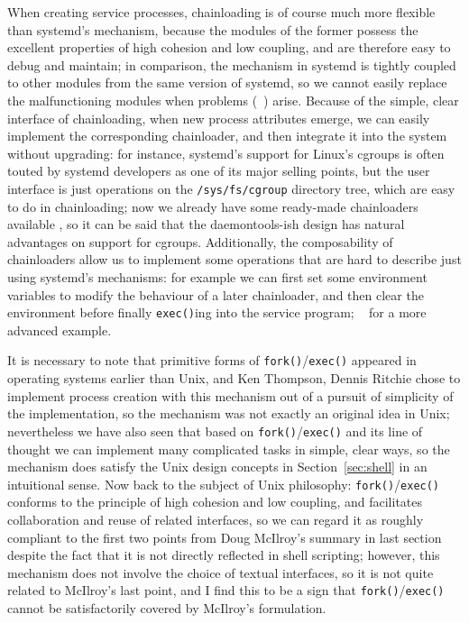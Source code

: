 When creating service processes, chainloading is of course much more flexible
than systemd's mechanism, because the modules of the former possess the
excellent properties of high cohesion and low coupling, and are therefore easy
to debug and maintain; in comparison, the mechanism in systemd is tightly
coupled to other modules from the same version of systemd, so we cannot easily
replace the malfunctioning modules when problems (\eg~\parencite{edge2017})
arise.  Because of the simple, clear interface of chainloading, when new process
attributes emerge, we can easily implement the corresponding chainloader, and
then integrate it into the system without upgrading: for instance, systemd's
support for Linux's cgroups is often touted by systemd developers as one of its
major selling points, but the user interface is just
operations on the \verb|/sys/fs/cgroup| directory tree, which are easy to do in
chainloading; now we already have some ready-made chainloaders available%
, so it can be said that the daemontools-ish design has
natural advantages on support for cgroups.  Additionally, the composability of
chainloaders allow us to implement some operations that are hard to describe
just using systemd's mechanisms: for example we can first set some environment
variables to modify the behaviour of a later chainloader, and then clear the
environment before finally \verb|exec()|ing into the service program;
\cf~\parencite{ska:syslogd} for a more advanced example.

It is necessary to note that primitive forms of \verb|fork()|/\verb|exec()|
appeared in operating systems earlier than Unix, and
Ken Thompson, Dennis Ritchie \etal{} chose to implement process creation with
this mechanism out of a pursuit of simplicity of the implementation, so the
mechanism was not exactly an original idea in Unix; nevertheless we have also
seen that based on \verb|fork()|/\verb|exec()| and its line of thought we can
implement many complicated tasks in simple, clear ways, so the mechanism does
satisfy the Unix design concepts in Section~\ref{sec:shell} in an intuitional
sense.  Now back to the subject of Unix philosophy: \verb|fork()|/\verb|exec()|
conforms to the principle of high cohesion and low coupling, and facilitates
collaboration and reuse of related interfaces, so we can regard it as roughly
compliant to the first two points from Doug McIlroy's summary in last
section despite the fact that it is not directly reflected in shell
scripting; however, this mechanism does not involve the choice of
textual interfaces, so it is not quite related to McIlroy's last point,
and I find this to be a sign that \verb|fork()|/\verb|exec()| cannot
be satisfactorily covered by McIlroy's formulation.

